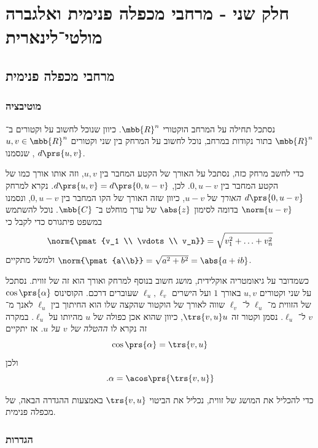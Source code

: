 \documentclass[a4paper,10pt,twoside,openany]{book}
\begin{document}
\part{חלק שני - מרחבי מכפלה פנימית ואלגברה מולטי־לינארית}

\chapter{מרחבי מכפלה פנימית}

\section{מוטיבציה}

נסתכל תחילה על המרחב הוקטורי
$\mbb{R}^n$.
כיוון שנוכל לחשוב על וקטורים ב־%
$\mbb{R}^n$
בתור נקודות במרחב, נוכל לחשוב על המרחק בין שני וקטורים
$u,v \in \mbb{R}^n$,
שנסמנו
$d\prs{u,v}$.

כדי לחשב מרחק כזה, נסתכל על האורך של הקטע המחבר בין
$u,v$,
וזה אותו אורך כמו של הקטע המחבר בין
$0,u-v$.
לכן,
$d\prs{u,v} = d\prs{0,u-v}$.
נקרא למרחק
$d\prs{0,u-v}$
\emph{האורך}
של
$u-v$,
כיוון שזה האורך של הקו המחבר בין
$0,u-v$,
ונסמנו
$\norm{u-v}$
בדומה לסימון
$\abs{z}$
של ערך מוחלט ב־%
$\mbb{C}$.
נוכל להשתמש במשפט פיתגורס כדי לקבל כי
\[\norm{\pmat{v_1 \\ \vdots \\ v_n}} = \sqrt{v_1^2 + \ldots + v_n^2}\]
ולמשל מתקיים
$\norm{\pmat{a\\b}} = \sqrt{a^2 + b^2} = \abs{a + ib}$.

כשמדובר על גיאומטריה אוקלידית, מושג חשוב בנוסף למרחק ואורך הוא זה של זווית. נסתכל על שני וקטורים
$u,v$
באורך
$1$
ועל הישרים
$\ell_u, \ell_v$
שעוברים דרכם.
הקוסינוס
$\cos\prs{\alpha}$
של הזווית מ־%
$\ell_u$
ל־%
$\ell_v$
שווה לאורך של הוקטור שהקצה שלו הוא החיתוך בין
$\ell_u$
לאנך מ־%
$v$
ל־%
$\ell_u$.
נסמן וקטור זה
$\trs{v,u} u$,
כיוון שהוא אכן כפולה של
$u$
מהיותו על
$\ell_u$.
במקרה זה נקרא לו
\emph{ההטלה של
$v$
על
$u$}.
אז יתקיים
\[\cos\prs{\alpha} = \trs{v,u}\]
ולכן
\[\text{.} \alpha = \acos\prs{\trs{v,u}}\]

כדי להכליל את המושג של זווית, נכליל את הביטוי
$\trs{v,u}$
באמצעות ההגדרה הבאה, של מכפלה פנימית.

\section{הגדרות}
\end{document}
